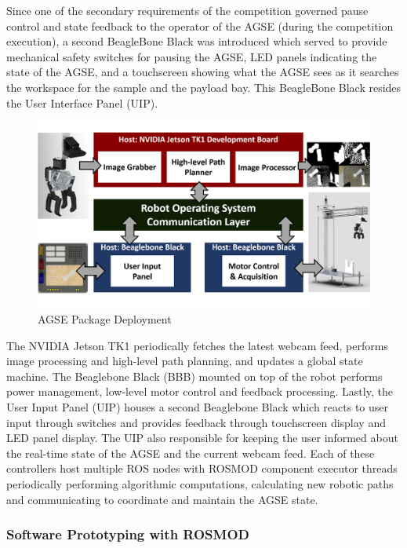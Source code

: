 Since one of the secondary requirements of the competition governed
pause control and state feedback to the operator of the AGSE (during
the competition execution), a second BeagleBone Black was introduced
which served to provide mechanical safety switches for pausing the
AGSE, LED panels indicating the state of the AGSE, and a touchscreen
showing what the AGSE sees as it searches the workspace for the sample
and the payload bay.  This BeagleBone Black resides the User Interface
Panel (UIP).

\begin{figure}[h]
	\centering
        \includegraphics[width=\textwidth]{Figures/AGSE_Deployment.png}
	\caption{AGSE Package Deployment}
	\label{fig:AGSE_Deployment}
\end{figure}

The NVIDIA Jetson TK1 periodically fetches the latest webcam feed,
performs image processing and high-level path planning, and updates a
global state machine. The Beaglebone Black (BBB) mounted on top of the
robot performs power management, low-level motor control and feedback
processing. Lastly, the User Input Panel (UIP) houses a second
Beaglebone Black which reacts to user input through switches and
provides feedback through touchscreen display and LED panel
display. The UIP also responsible for keeping the user
informed about the real-time state of the AGSE and the current webcam
feed. Each of these controllers host multiple ROS nodes with ROSMOD
component executor threads periodically performing algorithmic
computations, calculating new robotic paths and communicating to
coordinate and maintain the AGSE state.

\subsubsection{Software Prototyping with ROSMOD}

